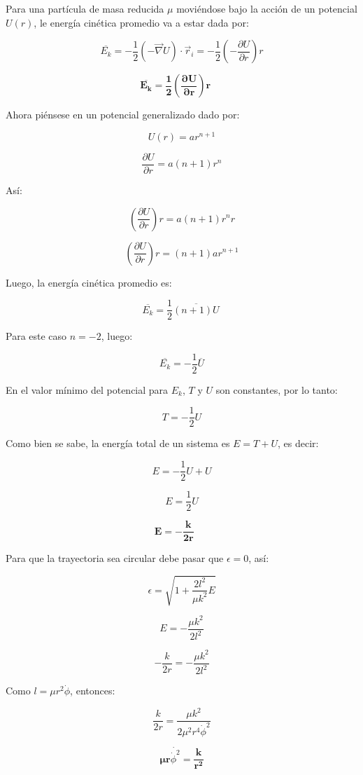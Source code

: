 \documentclass[]{article}
\begin{document}
Para una partícula de masa reducida \(\mu\) moviéndose bajo la acción de
un potencial \(U(r)\), le energía cinética promedio va a estar dada por:

\[\overline{E_{k}} = - \frac{1}{2}\left( - \overrightarrow{\nabla}U \right) \cdot {\overrightarrow{r}}_{i} = - \frac{1}{2}\left( - \frac{\partial U}{\partial r} \right)r\]

\[\overline{\mathbf{E}_{\mathbf{k}}}\mathbf{=}\frac{\mathbf{1}}{\mathbf{2}}\left( \frac{\mathbf{\partial U}}{\mathbf{\partial r}} \right)\mathbf{r\ \ \ \ \ \ }\]

Ahora piénsese en un potencial generalizado dado por:

\[U(r) = ar^{n + 1}\]

\[\frac{\partial U}{\partial r} = a(n + 1)r^{n}\]

Así:

\[\left( \frac{\partial U}{\partial r} \right)r = a(n + 1)r^{n}r\]

\[\left( \frac{\partial U}{\partial r} \right)r = (n + 1)ar^{n + 1}\]

Luego, la energía cinética promedio es:

\[\overline{E_{k}} = \frac{1}{2}\overline{(n + 1)U}\ \]

Para este caso \(n = - 2\), luego:

\[\overline{E_{k}} = - \frac{1}{2}\overline{U}\]

En el valor mínimo del potencial para \(E_{k}\), \(T\) y \(U\) son
constantes, por lo tanto:

\[T = - \frac{1}{2}U\]

Como bien se sabe, la energía total de un sistema es \(E = T + U\), es
decir:

\[E = - \frac{1}{2}U + U\]

\[E = \frac{1}{2}U\]

\[\mathbf{E = -}\frac{\mathbf{k}}{\mathbf{2}\mathbf{r}}\mathbf{\ \ \ \ \ \ \ }\]

Para que la trayectoria sea circular debe pasar que \(\epsilon = 0\),
así:

\[\epsilon = \sqrt{1 + \frac{2l^{2}}{\mu k^{2}}E}\]

\[E = - \frac{\mu k^{2}}{2l^{2}}\]

\[- \frac{k}{2r} = - \frac{\mu k^{2}}{2l^{2}}\]

Como \(l = \mu r^{2}\dot{\phi}\), entonces:

\[\frac{k}{2r} = \frac{\mu k^{2}}{2\mu^{2}r^{4}{\dot{\phi}}^{2}}\]

\[\mathbf{\mu r}\dot{{\dot{\phi}}^{2}}\mathbf{=}\frac{\mathbf{k}}{\mathbf{r}^{\mathbf{2}}}\]
\end{document}
